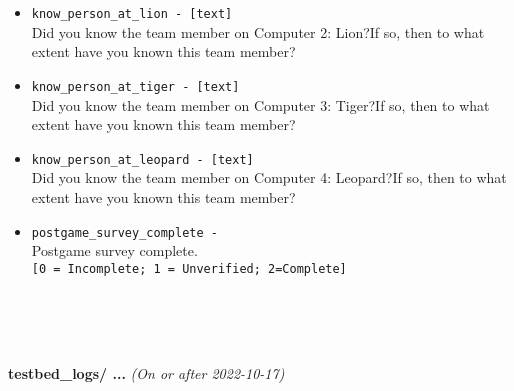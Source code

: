 \begin{description}
\begin{addmargin}[0em]{0em}
\begin{addmargin}[1em]{0em}
\begin{itemize}
            \item \verb|know_person_at_lion - [text]|\\Did you know the team member on Computer 2: Lion?If so, then to what extent have you known this team member?
            \item \verb|know_person_at_tiger - [text]|\\Did you know the team member on Computer 3: Tiger?If so, then to what extent have you known this team member?
            \item \verb|know_person_at_leopard - [text]|\\Did you know the team member on Computer 4: Leopard?If so, then to what extent have you known this team member?
            \item \verb|postgame_survey_complete - |\\Postgame survey complete.\\\verb|[0 = Incomplete; 1 = Unverified; 2=Complete]|
        \end{itemize}
    \end{addmargin} %
\end{addmargin} %






\textbf{\\\\\\}
\item\textbf{testbed\_logs/ ...} \textit{(On or after 2022-10-17)} %


\end{description}
